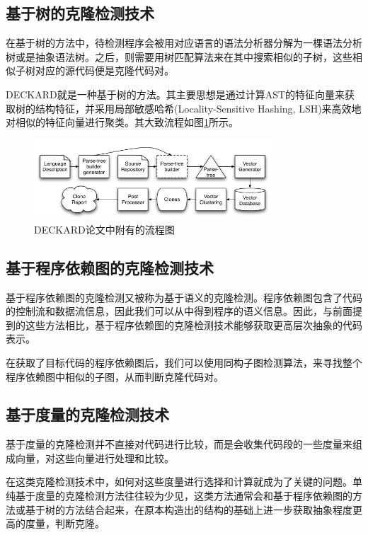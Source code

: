 \documentclass[UTF8]{ctexart}
\begin{document}
\subsection{基于树的克隆检测技术}

在基于树的方法中，待检测程序会被用对应语言的语法分析器分解为一棵语法分析树或是抽象语法树。之后，则需要用树匹配算法来在其中搜索相似的子树，这些相似子树对应的源代码便是克隆代码对。

DECKARD\cite{Jiang2007}就是一种基于树的方法。其主要思想是通过计算AST的特征向量来获取树的结构特征，并采用局部敏感哈希(Locality-Sensitive Hashing, LSH)来高效地对相似的特征向量进行聚类。其大致流程如图\ref{DECKARD}所示。


\begin{figure}[h]
	\centering
	\includegraphics[height=3cm]{Figures/DECKARD}
	\caption{DECKARD论文中附有的流程图}
	\label{DECKARD}
\end{figure}

\subsection{基于程序依赖图的克隆检测技术}

基于程序依赖图的克隆检测又被称为基于语义的克隆检测。程序依赖图包含了代码的控制流和数据流信息，因此我们可以从中得到程序的语义信息。因此，与前面提到的这些方法相比，基于程序依赖图的克隆检测技术能够获取更高层次抽象的代码表示。

在获取了目标代码的程序依赖图后，我们可以使用同构子图检测算法，来寻找整个程序依赖图中相似的子图，从而判断克隆代码对。

\subsection{基于度量的克隆检测技术}

基于度量的克隆检测并不直接对代码进行比较，而是会收集代码段的一些度量来组成向量，对这些向量进行处理和比较。

在这类克隆检测技术中，如何对这些度量进行选择和计算就成为了关键的问题。单纯基于度量的克隆检测方法往往较为少见，这类方法通常会和基于程序依赖图的方法或基于树的方法结合起来，在原本构造出的结构的基础上进一步获取抽象程度更高的度量，判断克隆。
\end{document}
